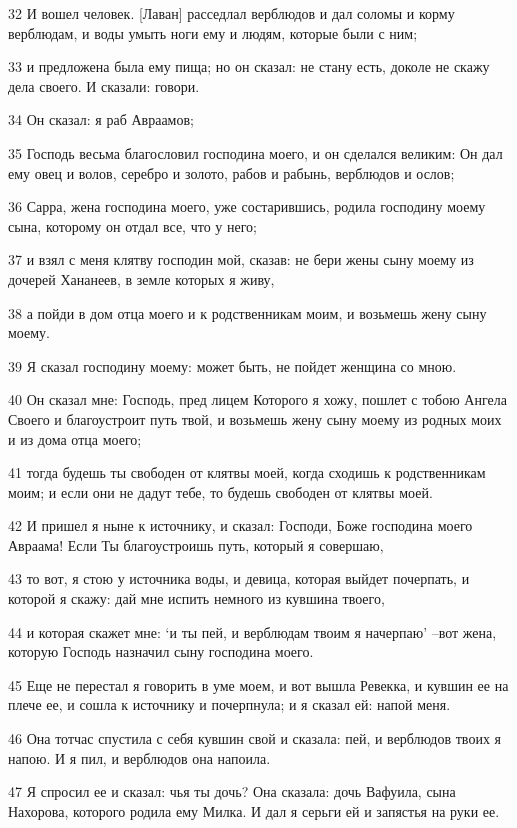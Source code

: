 \par 32 И вошел человек. [Лаван] расседлал верблюдов и дал соломы и корму верблюдам, и воды умыть ноги ему и людям, которые были с ним;
\par 33 и предложена была ему пища; но он сказал: не стану есть, доколе не скажу дела своего. И сказали: говори.
\par 34 Он сказал: я раб Авраамов;
\par 35 Господь весьма благословил господина моего, и он сделался великим: Он дал ему овец и волов, серебро и золото, рабов и рабынь, верблюдов и ослов;
\par 36 Сарра, жена господина моего, уже состарившись, родила господину моему сына, которому он отдал все, что у него;
\par 37 и взял с меня клятву господин мой, сказав: не бери жены сыну моему из дочерей Хананеев, в земле которых я живу,
\par 38 а пойди в дом отца моего и к родственникам моим, и возьмешь жену сыну моему.
\par 39 Я сказал господину моему: может быть, не пойдет женщина со мною.
\par 40 Он сказал мне: Господь, пред лицем Которого я хожу, пошлет с тобою Ангела Своего и благоустроит путь твой, и возьмешь жену сыну моему из родных моих и из дома отца моего;
\par 41 тогда будешь ты свободен от клятвы моей, когда сходишь к родственникам моим; и если они не дадут тебе, то будешь свободен от клятвы моей.
\par 42 И пришел я ныне к источнику, и сказал: Господи, Боже господина моего Авраама! Если Ты благоустроишь путь, который я совершаю,
\par 43 то вот, я стою у источника воды, и девица, которая выйдет почерпать, и которой я скажу: дай мне испить немного из кувшина твоего,
\par 44 и которая скажет мне: `и ты пей, и верблюдам твоим я начерпаю' --вот жена, которую Господь назначил сыну господина моего.
\par 45 Еще не перестал я говорить в уме моем, и вот вышла Ревекка, и кувшин ее на плече ее, и сошла к источнику и почерпнула; и я сказал ей: напой меня.
\par 46 Она тотчас спустила с себя кувшин свой и сказала: пей, и верблюдов твоих я напою. И я пил, и верблюдов она напоила.
\par 47 Я спросил ее и сказал: чья ты дочь? Она сказала: дочь Вафуила, сына Нахорова, которого родила ему Милка. И дал я серьги ей и запястья на руки ее.
